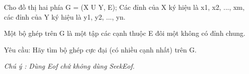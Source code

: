 Cho đồ thị hai phía G = (X U Y, E); Các đỉnh của X ký hiệu là x1, x2, ..., xm, các đỉnh của Y ký hiệu là y1, y2, ..., yn.   


   Một bộ ghép trên G là một tập các cạnh thuộc E đôi một không có đỉnh chung.   





       Yêu cầu: Hãy tìm bộ ghép cực đại (có nhiều cạnh nhất) trên G.      





\textit{    Chú ý : Dùng         Eof        chứ không dùng         SeekEof.       }